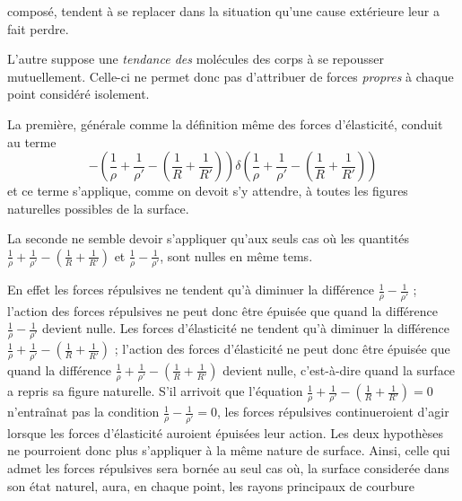 \documentclass[11pt,a4paper]{article}
\begin{document}

composé, tendent à se replacer dans la situation qu'une cause extérieure leur
a fait perdre.

L'autre suppose une \emph{tendance des} molécules des corps à se repousser
mutuellement. Celle-ci ne permet donc pas d'attribuer de forces \emph{propres}
à chaque point considéré isolement.

La première, générale comme la définition même des forces d'élasticité,
conduit au terme
\[
  -\left( \frac{1}{\rho} + \frac{1}{\rho'}
          - \left( \frac{1}{R} + \frac{1}{R'} \right) \right)
   \delta\left( \frac{1}{\rho} + \frac{1}{\rho'}
          - \left( \frac{1}{R} + \frac{1}{R'} \right) \right)
\]
et ce terme s'applique, comme on devoit s'y attendre, à toutes les figures
naturelles possibles de la surface.

La seconde ne semble devoir s'appliquer qu'aux seuls cas où les quantités
$\frac{1}{\rho} + \frac{1}{\rho'} - \left( \frac{1}{R} + \frac{1}{R'} \right)$
et $\frac{1}{\rho} - \frac{1}{\rho'}$, sont nulles en même tems.

En effet les forces répulsives ne tendent qu'à diminuer la différence
$\frac{1}{\rho} - \frac{1}{\rho'}$ ; l'action des forces répulsives ne peut
donc être épuisée que quand la différence
$\frac{1}{\rho} - \frac{1}{\rho'}$ devient nulle. Les forces d'élasticité ne
tendent qu'à diminuer la différence
$\frac{1}{\rho} + \frac{1}{\rho'} - \left( \frac{1}{R} + \frac{1}{R'} \right)$ ;
l'action des forces d'élasticité ne peut donc être épuisée que quand la
différence
$\frac{1}{\rho} + \frac{1}{\rho'} - \left( \frac{1}{R} + \frac{1}{R'} \right)$
devient nulle, c'est-à-dire quand la surface a repris sa figure naturelle.
S'il arrivoit que l'équation
$\frac{1}{\rho} + \frac{1}{\rho'} - \left( \frac{1}{R} + \frac{1}{R'} \right) = 0$
n'entraînat pas la condition
$\frac{1}{\rho} - \frac{1}{\rho'} = 0$, les forces répulsives continueroient
d'agir lorsque les forces d'élasticité auroient épuisées leur action. Les deux
hypothèses ne pourroient donc plus s'appliquer à la même nature de surface.
Ainsi, celle qui admet les forces répulsives sera bornée au seul cas où, la
surface considerée dans son état naturel, aura, en chaque point, les rayons
principaux de courbure
\end{document}
